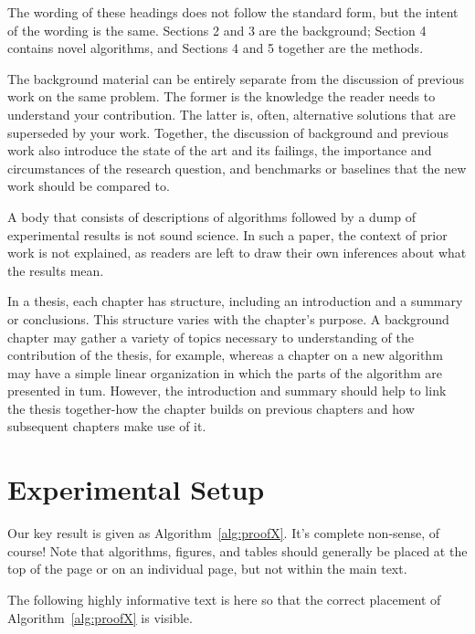 \documentclass[a4paper,oneside,bibliography=totoc]{scrbook}
\begin{document}
{  The wording of these headings does not follow the standard form, but the
  intent of the wording is the same. Sections 2 and 3 are the background;
  Section 4 contains novel algorithms, and Sections 4 and 5 together are the
  methods.

  The background material can be entirely separate from the discussion of
  previous work on the same problem. The former is the knowledge the reader
  needs to understand your contribution. The latter is, often, alternative
  solutions that are superseded by your work. Together, the discussion of
  background and previous work also introduce the state of the art and its
  failings, the importance and circumstances of the research question, and
  benchmarks or baselines that the new work should be compared to.

  A body that consists of descriptions of algorithms followed by a dump of
  experimental results is not sound science. In such a paper, the context of
  prior work is not explained, as readers are left to draw their own inferences
  about what the results mean.

  In a thesis, each chapter has structure, including an introduction and a
  summary or conclusions. This structure varies with the chapter's purpose. A
  background chapter may gather a variety of topics necessary to understanding
  of the contribution of the thesis, for example, whereas a chapter on a new
  algorithm may have a simple linear organization in which the parts of the
  algorithm are presented in tum. However, the introduction and summary should
  help to link the thesis together-how the chapter builds on previous chapters
  and how subsequent chapters make use of it. }

\chapter{Experimental Setup}

Our key result is given as Algorithm~\ref{alg:proofX}. It's complete non-sense,
of course! Note that algorithms, figures, and tables should generally be placed
at the top of the page or on an individual page, but not within the main text.

The following highly informative text is here so that the correct placement of
Algorithm~\ref{alg:proofX} is visible. \lipsum[1-3]
\end{document}
